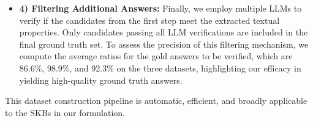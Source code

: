 \begin{itemize}[leftmargin=*]
\vspace{-2pt}
\item \textbf{4) Filtering Additional Answers:} 
Finally, we employ multiple LLMs to verify if the candidates from the first step meet the extracted textual properties. Only candidates passing all LLM verifications are included in the final ground truth set. To assess the precision of this filtering mechanism, we compute the average ratios for the gold answers to be verified, which are 86.6\%, 98.9\%, and 92.3\% on the three datasets, highlighting our efficacy in yielding high-quality ground truth answers.

\vspace{-2pt}
\end{itemize}

This dataset construction pipeline is automatic, efficient, and broadly applicable to the SKBs in our formulation.  
